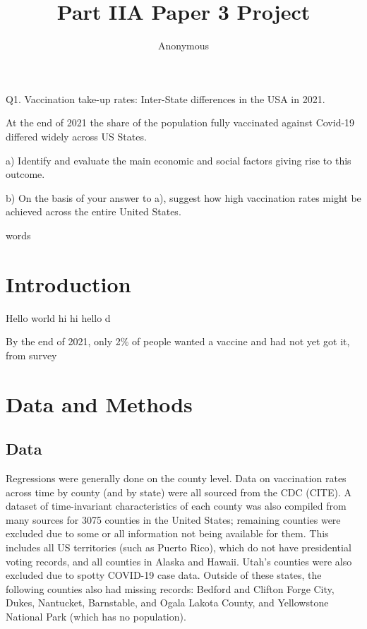 \documentclass[12pt]{article}
\title{Part IIA Paper 3 Project}
\author{
	Anonymous
}
\newcommand\wordcount{
	\immediate\write18{texcount -sum -1 \jobname.tex > count.txt} 
	
}
\begin{document}
	\maketitle
	\begin{spacing}{1.5} %
		Q1. Vaccination take-up rates: Inter-State differences in the USA in 2021.
		
		At the end of 2021 the share of the population fully vaccinated against Covid-19 differed widely across US States.
		
		a) Identify and evaluate the main economic and social factors giving rise to this outcome.
		
		b) On the basis of your answer to a), suggest how high vaccination rates might be achieved across the entire United States.
		
		\wordcount words
		\section{Introduction}
		Hello world hi hi hello d
		
		By the end of 2021, only 2\% of people wanted a vaccine and had not yet got it, from survey
		
		
		\section{Data and Methods}
		\subsection{Data}
		Regressions were generally done on the county level. Data on vaccination rates across time by county (and by state) were all sourced from the CDC (CITE). A dataset of time-invariant characteristics of each county was also compiled from many sources for 3075 counties in the United States; remaining counties were excluded due to some or all information not being available for them. This includes all US territories (such as Puerto Rico), which do not have presidential voting records, and all counties in Alaska and Hawaii. Utah's counties were also excluded due to spotty COVID-19 case data. Outside of these states, the following counties also had missing records: Bedford and Clifton Forge City, Dukes, Nantucket, Barnstable, and Ogala Lakota County, and Yellowstone National Park (which has no population).
		

\end{spacing}
\end{document}
